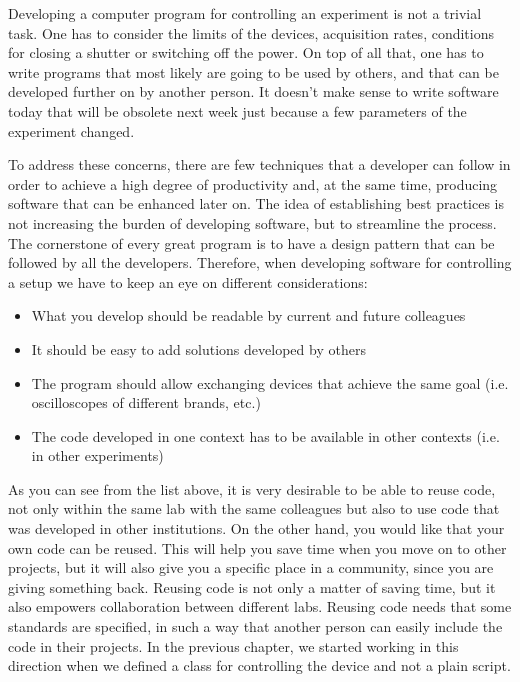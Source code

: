 Developing a computer program for controlling an experiment is not a
trivial task. One has to consider the limits of the devices, acquisition
rates, conditions for closing a shutter or switching off the power. On
top of all that, one has to write programs that most likely are going to
be used by others, and that can be developed further on by another
person. It doesn't make sense to write software today that will be
obsolete next week just because a few parameters of the
experiment changed.

To address these concerns, there are few techniques that a developer can
follow in order to achieve a high degree of productivity and, at the
same time, producing software that can be enhanced later on. The idea of
establishing best practices is not increasing the burden of developing
software, but to streamline the process. The cornerstone of every great
program is to have a design pattern that can be followed by all the
developers. Therefore, when developing software for controlling a setup
we have to keep an eye on different considerations:

\begin{itemize}
\item What you develop should be readable by current and future colleagues
\item It should be easy to add solutions developed by others
\item The program should allow exchanging devices that achieve the same goal (i.e. oscilloscopes of different brands, etc.)
\item The code developed in one context has to be available in other contexts (i.e. in other experiments)
\end{itemize}

As you can see from the list above, it is very desirable to be able to
reuse code, not only within the same lab with the same colleagues but
also to use code that was developed in other institutions. On the other hand, you would like that your own code can be reused. This will help you save time when you move on to other projects, but it will also give you a specific place in a community, since you are giving something back. Reusing code is not only a matter of saving time, but it also empowers collaboration between different labs. Reusing code needs that some standards are specified, in such a way that another person can easily include the code in their projects. In the previous chapter, we started working in this direction when we defined a class for controlling the device and not a plain script.

